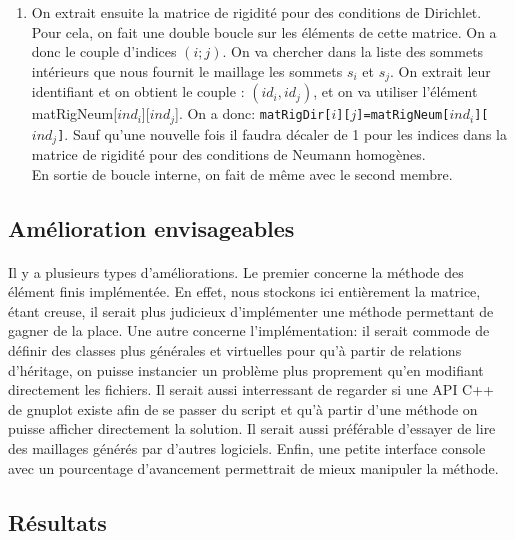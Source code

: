 \begin{enumerate}
\item On extrait ensuite la matrice de rigidité pour des conditions de Dirichlet. Pour cela, on fait une double boucle sur les éléments de cette matrice. On a donc le couple d'indices $(i;j)$. On va chercher dans la liste des sommets intérieurs que nous fournit le maillage les sommets $s_i$ et $s_j$. On extrait leur identifiant et on obtient le couple : $(id_i,id_j)$, et on va utiliser l'élément matRigNeum[$ind_i$][$ind_j$]. On a donc: \texttt{matRigDir[$i$][$j$]=matRigNeum[$ind_i$][$ind_j$]}. Sauf qu'une nouvelle fois il faudra décaler de 1 pour les indices dans la matrice de rigidité pour des conditions de Neumann homogènes.\\
 En sortie de boucle interne, on fait de même avec le second membre.
\end{enumerate}

\subsection{Amélioration envisageables}
\paragraph{} Il y a plusieurs types d'améliorations. Le premier concerne la méthode des élément finis implémentée. En effet, nous stockons ici entièrement la matrice, étant creuse, il serait plus judicieux d'implémenter une méthode permettant de gagner de la place. Une autre concerne l'implémentation: il serait commode de définir des classes plus générales et virtuelles pour qu'à partir de relations d'héritage, on puisse instancier un problème plus proprement qu'en modifiant directement les fichiers. Il serait aussi interressant de regarder si une API C++ de gnuplot existe afin de se passer du script et qu'à partir d'une méthode on puisse afficher directement la solution. Il serait aussi préférable d'essayer de lire des maillages générés par d'autres logiciels. Enfin, une petite interface console avec un pourcentage d'avancement permettrait de mieux manipuler la méthode. 

\subsection{Résultats}
